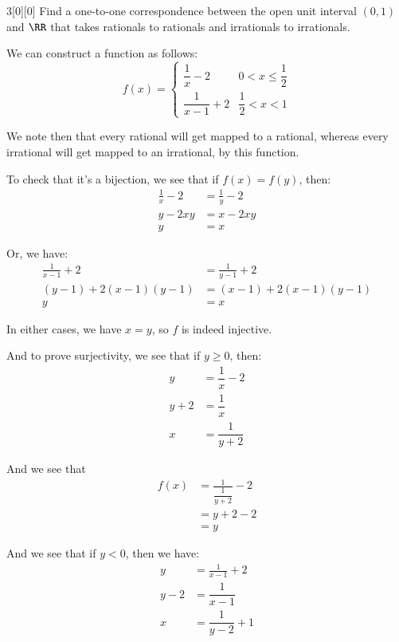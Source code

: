 \documentclass{article}
\begin{document}
\begin{hw}{3}[0][0]
	Find a one-to-one correspondence between the open unit interval $(0,1)$ and $\RR$ that takes rationals to rationals and irrationals to irrationals.
\end{hw}
\begin{solution}
	We can construct a function as follows:
	\begin{equation*}
		f(x) = \begin{cases}
			\dfrac{1}{x} - 2 & 0 < x \leq \dfrac{1}{2} \\
			\dfrac{1}{x-1} + 2 & \dfrac{1}{2} < x < 1
		\end{cases}
	\end{equation*}

	We note then that every rational will get mapped to a rational, whereas every irrational will get mapped to an irrational, by this function.
	
	To check that it's a bijection, we see that if $f(x) = f(y)$, then:
	\begin{align*}
		\frac{1}{x} - 2 &= \frac{1}{y} - 2 \\
		y - 2xy &= x - 2xy \\
		y &= x
	\end{align*}

	Or, we have:
	\begin{align*}
		\frac{1}{x-1} + 2 &= \frac{1}{y-1} + 2 \\ (y-1) + 2(x-1)(y-1) &= (x-1) + 2(x-1)(y-1) \\
		y &= x
	\end{align*}

	In either cases, we have $x = y$, so $f$ is indeed injective.
	
	And to prove surjectivity, we see that if $y \geq 0$, then:
	\begin{align*}
		y &= \dfrac{1}{x} - 2 \\
		y + 2 &= \dfrac{1}{x} \\
		x &= \dfrac{1}{y+2}
	\end{align*}

	And we see that
	\begin{align*}
		f(x) &= \frac{1}{\dfrac{1}{y+2}} - 2 \\
		&= y + 2 - 2 \\
		&= y
	\end{align*}

	And we see that if $y < 0$, then we have:
	\begin{align*}
		y &= \frac{1}{x-1} + 2 \\
		y - 2 &= \dfrac{1}{x-1} \\
		x &= \dfrac{1}{y-2} + 1
	\end{align*}


\end{solution}
\end{document}

